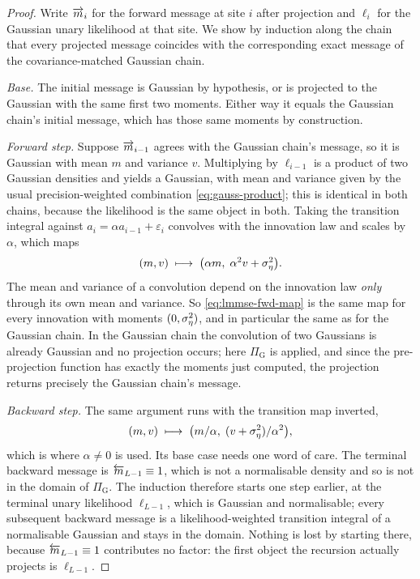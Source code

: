 \begin{proof}
Write $\overrightarrow{m}_{i}$ for the forward message at site $i$ after projection and
$\ell_i$ for the Gaussian unary likelihood at that site. We show by induction
along the chain that every projected message coincides with the corresponding
exact message of the covariance-matched Gaussian chain.

\emph{Base.} The initial message is Gaussian by hypothesis, or is projected to
the Gaussian with the same first two moments. Either way it equals the Gaussian
chain's initial message, which has those same moments by construction.

\emph{Forward step.} Suppose $\overrightarrow{m}_{i-1}$ agrees with the Gaussian chain's
message, so it is Gaussian with mean $m$ and variance $v$. Multiplying by
$\ell_{i-1}$ is a product of two Gaussian densities and yields a Gaussian,
with mean and variance given by the usual precision-weighted combination
\eqref{eq:gauss-product}; this is identical in both chains, because the
likelihood is the same object in both. Taking the transition integral against
$a_i = \alpha a_{i-1} + \varepsilon_i$ convolves with the innovation law and
scales by $\alpha$, which maps
\begin{equation}
  (m, v) \;\longmapsto\; \big(\alpha m,\; \alpha^2 v + \sigma_\eta^2\big).
  \label{eq:lmmse-fwd-map}
\end{equation}
The mean and variance of a convolution depend on the innovation law
\emph{only} through its own mean and variance. So \eqref{eq:lmmse-fwd-map} is
the same map for every innovation with moments $(0, \sigma_\eta^2)$, and in particular
the same as for the Gaussian chain. In the Gaussian chain the convolution of
two Gaussians is already Gaussian and no projection occurs; here
$\Pi_{\mathrm{G}}$ is applied, and since the pre-projection function has
exactly the moments just computed, the projection returns precisely the
Gaussian chain's message.

\emph{Backward step.} The same argument runs with the transition map inverted,
\begin{equation}
  (m, v) \;\longmapsto\; \big(m/\alpha,\; (v + \sigma_\eta^2)/\alpha^2\big),
  \label{eq:lmmse-bwd-map}
\end{equation}
which is where $\alpha \neq 0$ is used. Its base case needs one word of care.
The terminal backward message is $\overleftarrow{m}_{L-1} \equiv 1$, which is not a
normalisable density and so is not in the domain of $\Pi_{\mathrm{G}}$. The
induction therefore starts one step earlier, at the terminal unary likelihood
$\ell_{L-1}$, which is Gaussian and normalisable; every subsequent backward
message is a likelihood-weighted transition integral of a normalisable
Gaussian and stays in the domain. Nothing is lost by starting there, because
$\overleftarrow{m}_{L-1} \equiv 1$ contributes no factor: the first object the recursion
actually projects is $\ell_{L-1}$.


\end{proof}
